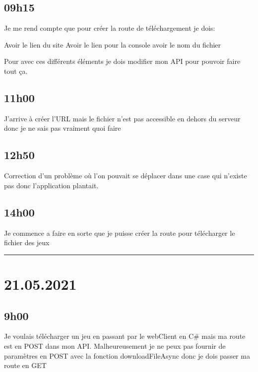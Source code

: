\documentclass[a4paper,12pt,french]{sphinxmanual}
\begin{document}
\subsection{09h15}
\label{\detokenize{logbook:id138}}
\sphinxAtStartPar
Je me rend compte que pour créer la route de téléchargement je dois:

\sphinxAtStartPar
Avoir le lien du site
Avoir le lien pour la console
avoir le nom du fichier

\sphinxAtStartPar
Pour avec ces différents éléments je dois modifier mon API pour pouvoir faire tout ça.


\subsection{11h00}
\label{\detokenize{logbook:id139}}
\sphinxAtStartPar
J’arrive à créer l’URL mais le fichier n’est pas accessible en dehors du serveur donc je ne sais pas vraiment quoi faire


\subsection{12h50}
\label{\detokenize{logbook:id140}}
\sphinxAtStartPar
Correction d’un problème où l’on pouvait se déplacer dans une case qui n’existe pas donc l’application plantait.


\subsection{14h00}
\label{\detokenize{logbook:id141}}
\sphinxAtStartPar
Je commence a faire en sorte que je puisse créer la route pour télécharger le fichier des jeux


\bigskip\hrule\bigskip



\section{21.05.2021}
\label{\detokenize{logbook:id142}}

\subsection{9h00}
\label{\detokenize{logbook:id143}}
\sphinxAtStartPar
Je voulais télécharger un jeu en passant par le webClient en C\# mais ma route est en POST dans mon API. Malheureusement je ne peux pas fournir de paramètres en POST avec la fonction downloadFileAsync donc je dois passer ma route en GET
\end{document}
